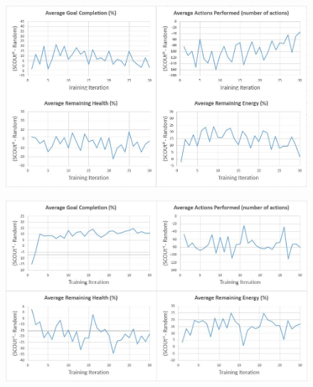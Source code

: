 \begin{appxfig}[H]
\begin{figure}[H]
  \centering
  \includegraphics[width=1.0\columnwidth]{Figures/Results/TrainingVariation2/Hybrid-FindHuman.JPG}
\end{figure}
\caption{Iteration testing performance results for $SCOUt_{H}$ attempting \textit{Find Human} using setup variation 2 (see subsection~\ref{subsec:training_variations}). All graphs show the controller's average difference in performance compared to $Random$ ($SCOUt_{H}$ average - $Random$ average) VS the number of training iterations completed.}
\label{appendix:hybrid_training_fh_variation2}
\end{appxfig}


\begin{appxfig}[H]
\begin{figure}[H]
  \centering
  \includegraphics[width=1.0\columnwidth]{Figures/Results/TrainingVariation2/Hybrid-MapWater.JPG}
\end{figure}
\caption{Iteration testing performance results for $SCOUt_{H}$ attempting \textit{Map Water} using setup variation 2 (see subsection~\ref{subsec:training_variations}). All graphs show the controller's average difference in performance compared to $Random$ ($SCOUt_{H}$ average - $Random$ average) VS the number of training iterations completed.}
\label{appendix:hybrid_training_mw_variation2}
\end{appxfig}





